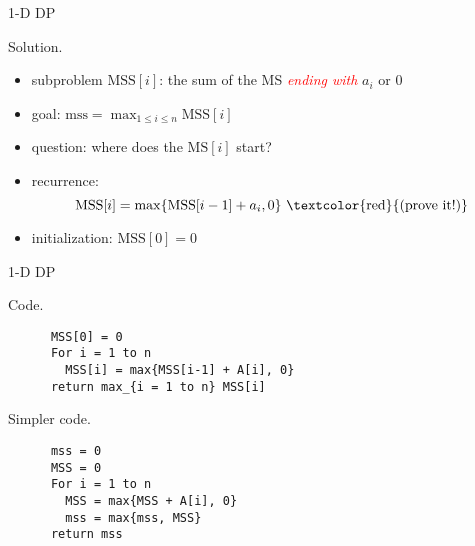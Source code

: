 \begin{frame}{1-D DP}
  \begin{block}{Solution.}
    \begin{itemize}
      \item subproblem $\text{MSS}[i]$: the sum of the MS \textcolor{red}{\it ending with} $a_{i}$ or 0
      \item goal: $\text{mss} = \max_{1 \le i \le n} \text{MSS}[i]$
      \item<2-> question: where does the $\text{MS}[i]$ start?
      \item<2-> recurrence: 
	\[ 
	  \text{MSS}[i] = \max \set{\text{MSS}[i-1] + a_{i}, 0} \text{ \textcolor{red}{(prove it!)}}
	\]
      \item<3-> initialization: $\text{MSS}[0] = 0$
    \end{itemize}

  \end{block}
\end{frame}
\begin{frame}[fragile]{1-D DP}
  \begin{block}{Code.}
    \begin{verbatim}
      MSS[0] = 0
      For i = 1 to n
        MSS[i] = max{MSS[i-1] + A[i], 0}
      return max_{i = 1 to n} MSS[i]
    \end{verbatim}
  \end{block}

  \begin{block}{Simpler code.}
    \begin{verbatim}
      mss = 0
      MSS = 0
      For i = 1 to n
        MSS = max{MSS + A[i], 0}
        mss = max{mss, MSS}
      return mss
    \end{verbatim}
  \end{block}
\end{frame}
